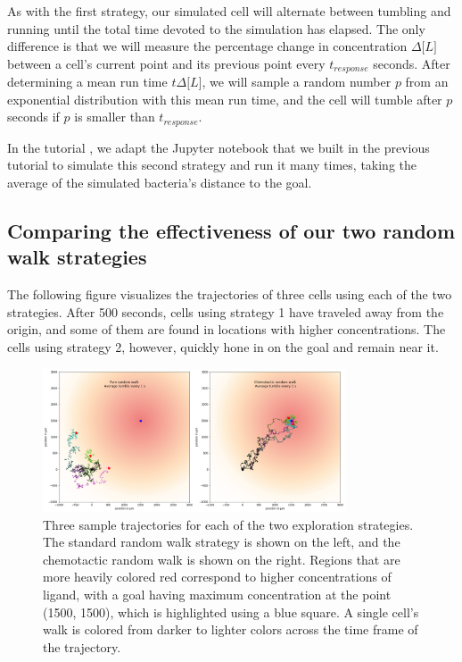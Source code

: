 As with the first strategy, our simulated cell will alternate between tumbling and running until the total time devoted to the simulation has elapsed. The only difference is that we will measure the percentage change in concentration $\Delta\text{[}L{]}$ between a cell's current point and its previous point every $t_{response}$ seconds. After determining a mean run time $t\Delta\text{[}L{]}$, we will sample a random number $p$ from an exponential distribution with this mean run time, and the cell will tumble after $p$ seconds if $p$ is smaller than $t_{response}$.

In the tutorial , we adapt the Jupyter notebook that we built in the previous tutorial to simulate this second strategy and run it many times, taking the average of the simulated bacteria's distance to the goal.

\FloatBarrier
{}
{}
\subsection{Comparing the effectiveness of our two random walk strategies}

The following figure visualizes the trajectories of three cells using each of the two strategies. After 500 seconds, cells using strategy 1 have traveled away from the origin, and some of them are found in locations with higher concentrations. The cells using strategy 2, however, quickly hone in on the goal and remain near it.

\begin{figure}[h]
\centering
\mySfFamily
\includegraphics[width = 0.8\textwidth]{../images/chemotaxis_traj_compare_uniform.png}
\caption{Three sample trajectories for each of the two exploration strategies. The standard random walk strategy is shown on the left, and the chemotactic random walk is shown on the right. Regions that are more heavily colored red correspond to higher concentrations of ligand, with a goal having maximum concentration at the point (1500, 1500), which is highlighted using a blue square. A single cell's walk is colored from darker to lighter colors across the time frame of the trajectory.}
\label{fig:chemotaxis_traj_compare_uniform}
\end{figure}


